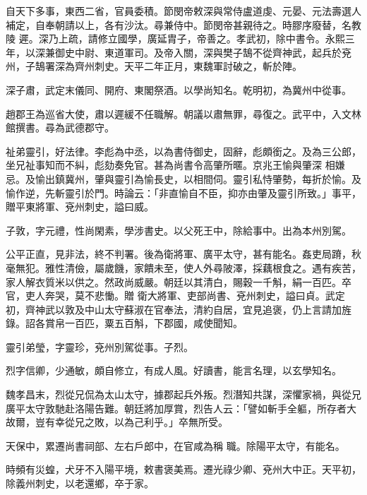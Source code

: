 \begin{pinyinscope}
 自天下多事，東西二省，官員委積。節閔帝敕深與常侍盧道虔、元晏、元法壽選人補定，自奉朝請以上，各有沙汰。尋兼侍中。節閔帝甚親待之。時膠序廢替，名教陵
 遲。深乃上疏，請修立國學，廣延胄子，帝善之。孝武初，除中書令。永熙三年，以深兼御史中尉、東道軍司。及帝入關，深與樊子鵠不從齊神武，起兵於兗州，子鵠署深為齊州刺史。天平二年正月，東魏軍討破之，斬於陣。



 深子肅，武定末儀同、開府、東閣祭酒。以學尚知名。乾明初，為冀州中從事。



 趙郡王為巡省大使，肅以遲緩不任職解。朝議以肅無罪，尋復之。武平中，入文林館撰書。尋為武德郡守。



 祉弟靈引，好法律。李彪為中丞，以為書侍御史，固辭，彪頗銜之。及為三公郎，坐兄祉事知而不糾，彪劾奏免官。甚為尚書令高肇所暱。京兆王愉與肇深
 相嫌忌。及愉出鎮冀州，肇與靈引為愉長史，以相間伺。靈引私恃肇勢，每折於愉。及愉作逆，先斬靈引於門。時論云：「非直愉自不臣，抑亦由肇及靈引所致。」事平，贈平東將軍、兗州刺史，謚曰威。



 子敦，字元禮，性尚閑素，學涉書史。以父死王中，除給事中。出為本州別駕。



 公平正直，見非法，終不判署。後為衛將軍、廣平太守，甚有能名。姦吏局蹐，秋毫無犯。雅性清儉，屬歲饑，家饋未至，使人外尋陂澤，採藕根食之。遇有疾苦，家人解衣質米以供之。然政尚威嚴。朝廷以其清白，賜穀一千斛，絹一百匹。卒官，吏人奔哭，莫不悲慟。贈
 衛大將軍、吏部尚書、兗州刺史，謚曰貞。武定初，齊神武以敦及中山太守蘇淑在官奉法，清約自居，宜見追褒，仍上言請加旌錄。詔各賞帛一百匹，粟五百斛，下郡國，咸使聞知。



 靈引弟瑩，字靈珍，兗州別駕從事。子烈。



 烈字信卿，少通敏，頗自修立，有成人風。好讀書，能言名理，以玄學知名。



 魏孝昌末，烈從兄侃為太山太守，據郡起兵外叛。烈潛知共謀，深懼家禍，與從兄廣平太守敦馳赴洛陽告難。朝廷將加厚賞，烈告人云：「譬如斬手全軀，所存者大故爾，豈有幸從兄之敗，以為己利乎。」卒無所受。



 天保中，累遷尚書祠部、左右戶郎中，在官咸為稱
 職。除陽平太守，有能名。



 時頻有災蝗，犬牙不入陽平境，敕書褒美焉。遷光祿少卿、兗州大中正。天平初，除義州刺史，以老還鄉，卒于家。




\end{pinyinscope}
